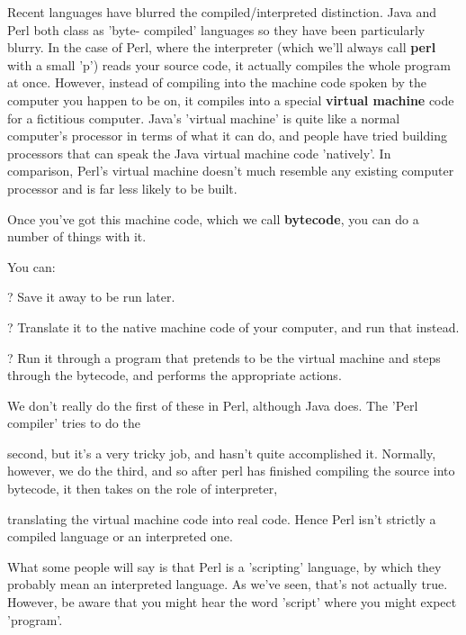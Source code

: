 \documentclass[a4paper,11pt]{book}
\begin{document}
\noindent Recent languages  have blurred  the  compiled/interpreted  distinction.  Java  and  Perl  both  class  as  'byte- compiled'  languages so they have  been  particularly  blurry.  In  the case  of  Perl,  where  the interpreter (which we'll always call \textbf{perl  }with  a  small  'p')  reads  your  source  code,  it  actually  compiles  the  whole program at once.  However,  instead  of compiling  into  the  machine  code  spoken  by  the computer  you happen  to  be on,  it compiles into  a  special  \textbf{virtual machine  }code  for  a  fictitious  computer.  Java's 'virtual machine'  is quite  like  a  normal  computer's  processor  in  terms  of  what it  can do,  and  people have tried building  processors  that  can  speak  the  Java  virtual  machine  code  'natively'.  In  comparison, Perl's virtual  machine  doesn't  much  resemble  any  existing  computer  processor  and is  far less  likely  to be built.

\noindent 

\noindent Once  you've got this machine  code,  which  we  call  \textbf{bytecode},  you  can  do  a  number  of  things  with it.

\noindent You can:

\noindent 

\noindent ? Save it away to be run later.

\noindent 

\noindent ? Translate it to the native machine code of your computer, and run that instead.

\noindent 

\noindent ? Run it through a program that pretends to be the virtual machine and steps through the bytecode, and performs the appropriate actions.

\noindent 

\noindent We don't really do the first of these in Perl, although Java does. The 'Perl compiler' tries to do the

\noindent second, but it's a very tricky job, and hasn't quite accomplished it. Normally, however, we do the third, and so after perl has finished compiling the source into bytecode, it then takes on the role of interpreter,

\noindent translating the virtual machine code into real code. Hence Perl isn't strictly a compiled language or an interpreted one.

\noindent 

\noindent What some people will say is that Perl is a 'scripting' language, by which they probably mean an interpreted language. As we've seen, that's not actually true. However, be aware that you might hear the word 'script' where you might expect 'program'.
\end{document}
